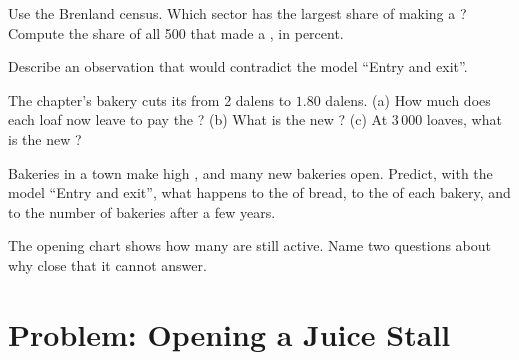 \begin{exercise}[$\star\star$]\label{exo:g7:firms:8}
Use the Brenland census. Which sector has the largest share of  making a ? Compute the
share of all 500  that made a , in percent.
\end{exercise}

\begin{exercise}[$\star\star$]\label{exo:g7:firms:9}
Describe an observation that would contradict the model ``Entry and exit''.
\end{exercise}

\begin{exercise}[$\star\star\star$]\label{exo:g7:firms:10}
The chapter's bakery cuts its  from 2 dalens to $1.80$ dalens. (a) How much does each loaf
now leave to pay the ? (b) What is the new ? (c) At $3\,000$ loaves,
what is the new ?
\end{exercise}

\begin{exercise}[$\star\star\star$]\label{exo:g7:firms:11}
Bakeries in a town make high , and many new bakeries open. Predict, with the model ``Entry
and exit'', what happens to the  of bread, to the  of each bakery, and to the number of
bakeries after a few years.
\end{exercise}

\begin{exercise}[$\star\star\star$]\label{exo:g7:firms:12}
The opening chart shows how many  are still active. Name two questions about why  close
that it cannot answer.
\end{exercise}

\section{Problem: Opening a Juice Stall}

